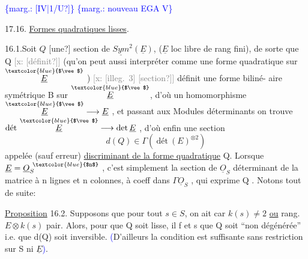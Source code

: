 \documentclass[11pt]{article}
\newcommand{\scanpage}[1]{\par\bigskip\noindent{\small\sffamily[scan #1]}\par}
\newcommand{\mspage}[1]{{\small\sffamily[p.\,#1]}}
\newcommand{\hand}[1]{\textcolor{blue}{#1}}
\newcommand{\margin}[1]{\textcolor{blue}{\{\textsf{marg.:} #1\}}}
\newcommand{\xout}[1]{\textcolor{gray}{[\textsf{x:} #1]}}
\newcommand{\uline}[1]{\underline{#1}}
\newcommand{\unsure}[1]{[#1?]}
\newcommand{\illegible}[1]{[\textsf{illeg.\ #1}]}
\begin{document}
\clearpage
\scanpage{25/173}
\mspage{\hand{173}}

\clearpage
\scanpage{25/174}
\margin{\unsure{IV|1/U}} \margin{nouveau EGA V} \mspage{1}

17.16. \uline{Formes quadratiques lisses}.

16.1.Soit $Q$ \unsure{une} section de $\underline{Sym}^2(\underline{E})$, ($\underline{E}$ loc libre de rang fini),
de sorte que Q \xout{\unsure{définit}} (qu'on peut aussi interpréter comme une forme
quadratique sur $\overset{\hand{$\vee$}}{\underline{E}}$ ) \xout{\illegible{3} \unsure{section}} définit une forme biliné-%
aire symétrique B sur $\overset{\hand{$\vee$}}{\underline{E}}$, d'où un homomorphisme $\overset{\hand{$\vee$}}{\underline{E}} \longrightarrow \underline{E}$ , et passant aux
Modules déterminants on trouve $\text{dét}\ \overset{\hand{$\vee$}}{\underline{E}} \longrightarrow \det \underline{E}$ , d'où enfin une section
\[ d(Q) \in \Gamma(\ \text{dét}\ (E)^{\otimes 2}) \]
appelée (sauf erreur) \uline{discriminant de la forme quadratique} Q. Lorsque
$\underline{E} = \underline{O}_S^{\ \hand{$n$}}$ , c'est simplement la section de $\underline{O}_S$ déterminant de la matrice
à n lignes et n colonnes, à coeff dans $\Gamma\underline{O}_S$ , qui exprime Q . Notons tout
de suite:

\uline{Proposition} 16.2. Supposons que pour tout $s \in S$, on ait car $k(s) \neq 2$ \uline{ou}
rang. $E\otimes k(s)$ pair. Alors, pour que Q soit lisse, il f et s que Q soit
``non dégénérée'' i.e. que d(Q) soit inversible. \hand{(}D'ailleurs la condition est
suffisante sans restriction sur S ni $\underline{E}$\hand{)}.
\end{document}
